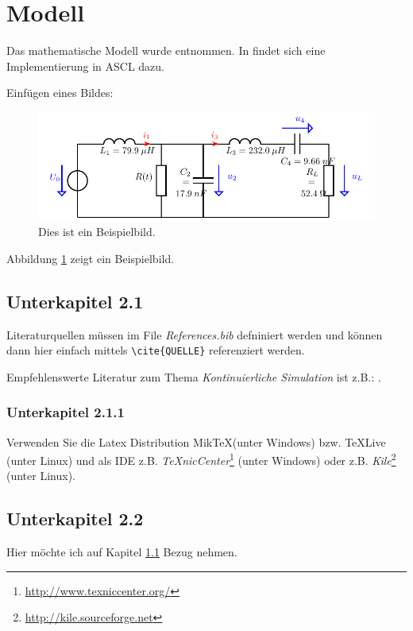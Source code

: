 \documentclass[a4paper,11pt]{scrartcl}
\begin{document}
\section{Modell}

Das mathematische Modell wurde \cite{zeigler2000theory} entnommen.
In \cite{BEBG93} findet sich eine Implementierung in ASCL dazu.

Einfügen eines Bildes:
\begin{figure}[!ht]
 \centering
 \includegraphics[width=\textwidth]{./Bilder/ClassEAmplifier.pdf}
 \caption{Dies ist ein Beispielbild.}
 \label{fig:Bild1}
\end{figure}

Abbildung \ref{fig:Bild1} zeigt ein Beispielbild.

\subsection{Unterkapitel 2.1}
\label{sec:Unterkapitel21}
 Literaturquellen müssen im File \textit{References.bib} defniniert werden und können
 dann hier einfach mittels \verb|\cite{QUELLE}| referenziert werden.

 Empfehlenswerte Literatur zum Thema \emph{Kontinuierliche Simulation} ist z.B.:
 \cite{CK06}.

\subsubsection{Unterkapitel 2.1.1}
 Verwenden Sie die Latex Distribution Mik\TeX (unter Windows) bzw. \TeX  Live (unter Linux)
 und als IDE z.B. \emph{\TeX nicCenter}\footnote{\url{http://www.texniccenter.org/}} (unter Windows)
 oder z.B. \emph{Kile}\footnote{\url{http://kile.sourceforge.net}} (unter Linux).

\subsection{Unterkapitel 2.2}
Hier möchte ich auf Kapitel \ref{sec:Unterkapitel21} Bezug nehmen.
\end{document}
